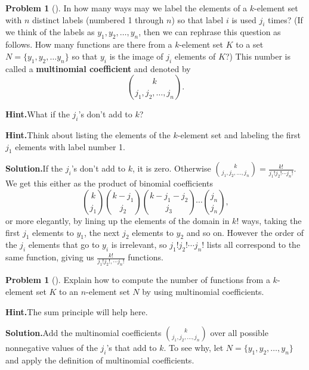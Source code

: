\documentclass[10pt,]{book}
\newcommand{\terminology}[1]{\textbf{#1}}
\theoremstyle{plain}
\theoremstyle{definition}
\newtheorem{activity}[project]{Problem}
\theoremstyle{definition}
\numberwithin{equation}{chapter}
\begin{document}
\begin{activity}[]\label{activity-148}
In how many ways may we label the elements of a \(k\)-element set with \(n\) distinct labels (numbered 1 through \(n\)) so that label \(i\) is used \(j_i\) times? (If we think of the labels as \(y_1, y_2, \ldots, y_n\), then we can rephrase this question as follows.  How many functions are there from a \(k\)-element set \(K\) to a set \(N=\{y_1,y_2,\ldots y_n\}\) so that \(y_i\) is the image of \(j_i\) elements of \(K\)?) This number is called a \terminology{multinomial coefficient} and denoted by%
\begin{equation*}
\binom{k}{j_1,j_2,\ldots, j_n}.
\end{equation*}
%
\par\medskip\noindent%
\textbf{Hint.}\quad What if the \(j_i\)'s don't add to \(k\)?%
\par\medskip\noindent%
\textbf{Hint.}\quad Think about listing the elements of the \(k\)-element set and labeling the first \(j_1\) elements with label number 1.%
\par\medskip\noindent%
\textbf{Solution.}\quad If the \(j_i\)'s don't add to \(k\), it is zero.  Otherwise \(\binom{k}{j_1,j_2,\ldots, j_n} =
\frac{k!}{j_1!j_2!\cdots j_n!}\). We get this either as the product of binomial coefficients%
\begin{equation*}
\binom{k}{j_1}\binom{k-j_1}{j_2}\binom{k-j_1-j_2}{j_3}\cdots\binom{j_n}{j_n},
\end{equation*}
or more elegantly, by lining up the elements of the domain in \(k!\) ways, taking the first \(j_1\) elements to \(y_1\), the next \(j_2\) elements to \(y_2\) and so on.  However the order of the \(j_i\) elements that go to \(y_i\) is irrelevant, so \(j_1!j_2!\cdots j_n!\) lists all correspond to the same function, giving us \(\frac{k!}{j_1!j_2!,\cdots j_n!}\) functions.%
\end{activity}
\begin{activity}[]\label{activity-149}
Explain how to compute the number of functions from a \(k\)-element set \(K\) to an \(n\)-element set \(N\) by using multinomial coefficients.%
\par\medskip\noindent%
\textbf{Hint.}\quad The sum principle will help here.%
\par\medskip\noindent%
\textbf{Solution.}\quad Add the multinomial coefficients \(\binom{k}{j_1,j_2,\ldots,j_n}\) over all possible nonnegative values of the \(j_i\)'s that add to \(k\).  To see why, let \(N=\{y_1,y_2,\ldots,y_n\}\) and apply the definition of multinomial coefficients.%
\end{activity}
\end{document}
